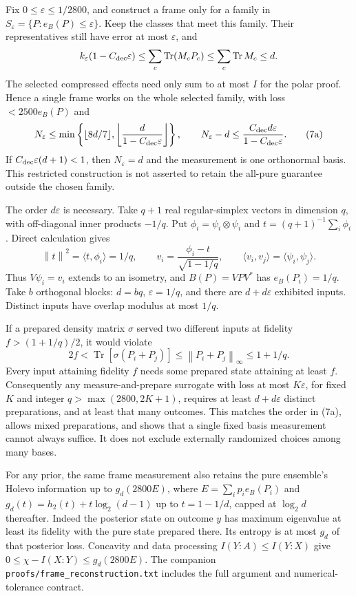 \documentclass[11pt]{article}
\newcommand{\Tr}{\operatorname{Tr}}
\newcommand{\norm}[1]{\left\lVert#1\right\rVert}
\begin{document}
Fix $0\le\varepsilon\le1/2800$, and construct a frame only for a family in $S_\varepsilon=\{P:e_B(P)\le\varepsilon\}$. Keep the classes that meet this family. Their representatives still have error at most $\varepsilon$, and
\[
k_\varepsilon(1-C_{\rm dec}\varepsilon)
\le\sum_c\Tr(M_cP_c)\le\sum_c\Tr M_c\le d.
\]
The selected compressed effects need only sum to at most $I$ for the polar proof. Hence a single frame works on the whole selected family, with loss $<2500e_B(P)$ and
\[
N_\varepsilon\le\min\left\{\lfloor8d/7\rfloor,
\left\lfloor\frac d{1-C_{\rm dec}\varepsilon}\right\rfloor\right\},\qquad
N_\varepsilon-d\le\frac{C_{\rm dec}d\varepsilon}{1-C_{\rm dec}\varepsilon}.
\tag{7a}
\]
If $C_{\rm dec}\varepsilon(d+1)<1$, then $N_\varepsilon=d$ and the measurement is one orthonormal basis. This restricted construction is not asserted to retain the all-pure guarantee outside the chosen family.

The order $d\varepsilon$ is necessary. Take $q+1$ real regular-simplex vectors in dimension $q$, with off-diagonal inner products $-1/q$. Put $\phi_i=\psi_i\otimes\psi_i$ and $t=(q+1)^{-1}\sum_i\phi_i$. Direct calculation gives
\[
\norm t^2=\langle t,\phi_i\rangle=1/q,\qquad
v_i=\frac{\phi_i-t}{\sqrt{1-1/q}},\qquad
\langle v_i,v_j\rangle=\langle\psi_i,\psi_j\rangle.
\]
Thus $V\psi_i=v_i$ extends to an isometry, and $B(P)=VPV^*$ has $e_B(P_i)=1/q$. Take $b$ orthogonal blocks: $d=bq$, $\varepsilon=1/q$, and there are $d+d\varepsilon$ exhibited inputs. Distinct inputs have overlap modulus at most $1/q$.

If a prepared density matrix $\sigma$ served two different inputs at fidelity $f>(1+1/q)/2$, it would violate
\[
2f<\Tr[\sigma(P_i+P_j)]\le\norm{P_i+P_j}_\infty\le1+1/q.
\]
Every input attaining fidelity $f$ needs some prepared state attaining at least $f$. Consequently any measure-and-prepare surrogate with loss at most $K\varepsilon$, for fixed $K$ and integer $q>\max(2800,2K+1)$, requires at least $d+d\varepsilon$ distinct preparations, and at least that many outcomes. This matches the order in (7a), allows mixed preparations, and shows that a single fixed basis measurement cannot always suffice. It does not exclude externally randomized choices among many bases.

For any prior, the same frame measurement also retains the pure ensemble's Holevo information up to $g_d(2800E)$, where $E=\sum_i p_i e_B(P_i)$ and $g_d(t)=h_2(t)+t\log_2(d-1)$ up to $t=1-1/d$, capped at $\log_2d$ thereafter. Indeed the posterior state on outcome $y$ has maximum eigenvalue at least its fidelity with the pure state prepared there. Its entropy is at most $g_d$ of that posterior loss. Concavity and data processing $I(Y:A)\le I(Y:X)$ give $0\le\chi-I(X:Y)\le g_d(2800E)$. The companion \texttt{proofs/frame\_reconstruction.txt} includes the full argument and numerical-tolerance contract.
\end{document}
